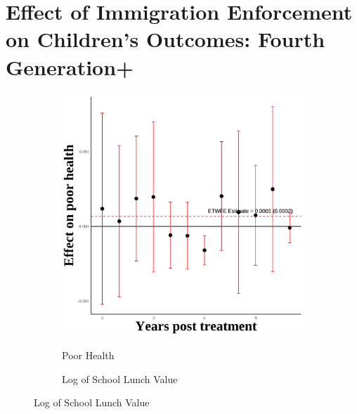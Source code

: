 \documentclass[12pt,english]{article}
\begin{document}
\pagebreak

\section{Effect of Immigration Enforcement on Children's Outcomes: Fourth Generation+}
\begin{figure}[H]
  \caption{Effect of Immigration Enforcement on Fourth Generation+ Outcomes}
  \centering

  \begin{subfigure}[b]{0.3\textwidth}
    \centering
    \caption{Poor Health}
    \includegraphics[width=\linewidth]{figures/plot89-poor_health_event_study-fourth.png}
    \label{fig:poor-health-fourth}
  \end{subfigure}
  \hfill
  \begin{subfigure}[b]{0.3\textwidth}
    \centering
    \caption{Log of School Lunch Value}

\end{subfigure}
\end{figure}
\end{document}
